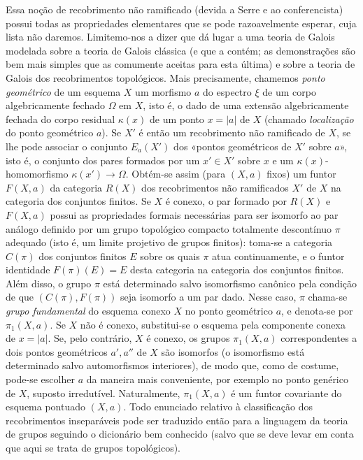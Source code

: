 Essa noção de recobrimento não ramificado (devida a Serre e ao conferencista)
possui todas as propriedades elementares que se pode razoavelmente esperar, cuja
lista não daremos. Limitemo-nos a dizer que dá lugar a uma teoria de Galois
modelada sobre a teoria de Galois clássica (e que a contém; as
demonstrações são bem mais simples que as comumente aceitas para
esta última) e sobre a teoria de Galois dos recobrimentos topológicos. Mais
precisamente, chamemos \emph{ponto geométrico} de um esquema $X$ um morfismo
$a$ do espectro $\xi$ de um corpo algebricamente fechado $\Omega$ em $X$,
isto é, o dado de uma extensão algebricamente fechada do corpo residual
$\kappa(x)$ de um ponto $x=|a|$ de $X$ (chamado \emph{localização} do ponto
geométrico $a$). Se $X'$ é então um recobrimento não ramificado de $X$, se
lhe pode associar o conjunto $E_a(X')$ dos «pontos geométricos de $X'$ sobre
$a$», isto é, o conjunto dos pares formados por um $x'\in X'$ sobre $x$
e um $\kappa(x)$-homomorfismo $\kappa(x')\longrightarrow\Omega$. Obtém-se assim
(para $(X,a)$ fixos) um funtor $F(X,a)$ da categoria $R(X)$ dos
recobrimentos não ramificados $X'$ de $X$ na categoria dos conjuntos
finitos. Se $X$ é conexo, o par formado por $R(X)$ e $F(X,a)$ possui as
propriedades formais necessárias para ser isomorfo ao par análogo definido por
um grupo topológico compacto totalmente descontínuo $\pi$ adequado (isto é,
um limite projetivo de grupos finitos): toma-se a categoria $C(\pi)$ dos
conjuntos finitos $E$ sobre os quais $\pi$ atua continuamente, e o funtor
identidade $F(\pi)(E)=E$ desta categoria na categoria dos conjuntos
finitos. Além disso, o grupo $\pi$ está determinado salvo isomorfismo canônico pela
condição de que $(C(\pi),F(\pi))$ seja isomorfo a um par dado. Nesse caso,
$\pi$ chama-se \emph{grupo fundamental} do esquema conexo $X$ no ponto
geométrico $a$, e denota-se por $\pi_1(X,a)$. Se $X$ não é conexo, substitui-se
o esquema pela componente conexa de $x=|a|$. Se, pelo contrário, $X$ é
conexo, os grupos $\pi_1(X,a)$ correspondentes a dois pontos geométricos
$a',a''$ de $X$ são isomorfos (o isomorfismo está determinado salvo
automorfismos interiores), de modo que, como de costume, pode-se escolher $a$
da maneira mais conveniente, por exemplo no ponto genérico de $X$, suposto
irredutível. Naturalmente, $\pi_1(X,a)$ é um funtor covariante do esquema
pontuado $(X,a)$. Todo enunciado relativo à classificação dos
recobrimentos inseparáveis pode ser traduzido então para a linguagem da teoria de
grupos seguindo o dicionário bem conhecido (salvo que se deve levar em conta
que aqui se trata de grupos topológicos).

